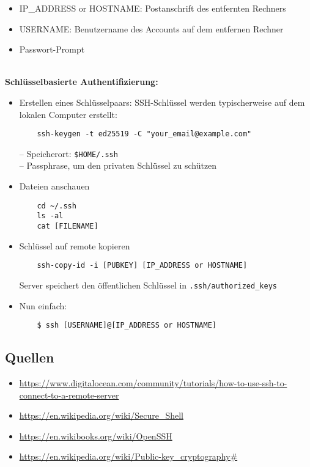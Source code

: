 \begin{itemize}
	\item IP\_ADDRESS or HOSTNAME: Postanschrift des entfernten Rechners
	\item USERNAME: Benutzername des Accounts auf dem entfernen Rechner
	\item Passwort-Prompt
\end{itemize}
%
~\\
\textbf{Schlüsselbasierte Authentifizierung:}
\begin{itemize}
	\item Erstellen eines Schlüsselpaars: SSH-Schlüssel werden typischerweise auf dem lokalen Computer erstellt:
	\begin{verbatim}
	ssh-keygen -t ed25519 -C "your_email@example.com"
	\end{verbatim}
	-- Speicherort: \texttt{\$HOME/.ssh}\\
	-- Passphrase, um den privaten Schlüssel zu schützen
	\item Dateien anschauen
	\begin{verbatim}
	cd ~/.ssh
	ls -al
	cat [FILENAME]
	\end{verbatim}
	\item Schlüssel auf remote kopieren
	\begin{verbatim}
	ssh-copy-id -i [PUBKEY] [IP_ADDRESS or HOSTNAME]
	\end{verbatim}
	Server speichert den öffentlichen Schlüssel in \texttt{.ssh/authorized\_keys}
	\item Nun einfach:
	\begin{verbatim}
	$ ssh [USERNAME]@[IP_ADDRESS or HOSTNAME]
	\end{verbatim}
\end{itemize}





\subsection{Quellen}
\begin{itemize}
	\item \url{https://www.digitalocean.com/community/tutorials/how-to-use-ssh-to-connect-to-a-remote-server}
	\item \url{https://en.wikipedia.org/wiki/Secure_Shell}
	\item \url{https://en.wikibooks.org/wiki/OpenSSH}
	\item \url{https://en.wikipedia.org/wiki/Public-key_cryptography#}
\end{itemize}